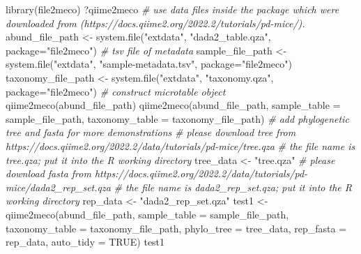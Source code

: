 \documentclass[
]{book}
\newenvironment{Shaded}{\begin{snugshade}}{\end{snugshade}}
\newcommand{\AttributeTok}[1]{\textcolor[rgb]{0.77,0.63,0.00}{#1}}
\newcommand{\CommentTok}[1]{\textcolor[rgb]{0.56,0.35,0.01}{\textit{#1}}}
\newcommand{\ConstantTok}[1]{\textcolor[rgb]{0.00,0.00,0.00}{#1}}
\newcommand{\FunctionTok}[1]{\textcolor[rgb]{0.00,0.00,0.00}{#1}}
\newcommand{\NormalTok}[1]{#1}
\newcommand{\OtherTok}[1]{\textcolor[rgb]{0.56,0.35,0.01}{#1}}
\newcommand{\StringTok}[1]{\textcolor[rgb]{0.31,0.60,0.02}{#1}}
\begin{document}
\begin{Shaded}
\begin{Highlighting}[]
\FunctionTok{library}\NormalTok{(file2meco)}
\NormalTok{?qiime2meco}
\CommentTok{\# use data files inside the package which were downloaded from (https://docs.qiime2.org/2022.2/tutorials/pd{-}mice/).}
\NormalTok{abund\_file\_path }\OtherTok{\textless{}{-}} \FunctionTok{system.file}\NormalTok{(}\StringTok{"extdata"}\NormalTok{, }\StringTok{"dada2\_table.qza"}\NormalTok{, }\AttributeTok{package=}\StringTok{"file2meco"}\NormalTok{)}
\CommentTok{\# tsv file of metadata}
\NormalTok{sample\_file\_path }\OtherTok{\textless{}{-}} \FunctionTok{system.file}\NormalTok{(}\StringTok{"extdata"}\NormalTok{, }\StringTok{"sample{-}metadata.tsv"}\NormalTok{, }\AttributeTok{package=}\StringTok{"file2meco"}\NormalTok{)}
\NormalTok{taxonomy\_file\_path }\OtherTok{\textless{}{-}} \FunctionTok{system.file}\NormalTok{(}\StringTok{"extdata"}\NormalTok{, }\StringTok{"taxonomy.qza"}\NormalTok{, }\AttributeTok{package=}\StringTok{"file2meco"}\NormalTok{)}
\CommentTok{\# construct microtable object}
\FunctionTok{qiime2meco}\NormalTok{(abund\_file\_path)}
\FunctionTok{qiime2meco}\NormalTok{(abund\_file\_path, }\AttributeTok{sample\_table =}\NormalTok{ sample\_file\_path, }\AttributeTok{taxonomy\_table =}\NormalTok{ taxonomy\_file\_path)}
\CommentTok{\# add phylogenetic tree and fasta for more demonstrations}
\CommentTok{\# please download tree from https://docs.qiime2.org/2022.2/data/tutorials/pd{-}mice/tree.qza}
\CommentTok{\# the file name is \textquotesingle{}tree.qza\textquotesingle{}; put it into the R working directory}
\NormalTok{tree\_data }\OtherTok{\textless{}{-}} \StringTok{"tree.qza"}
\CommentTok{\# please download fasta from https://docs.qiime2.org/2022.2/data/tutorials/pd{-}mice/dada2\_rep\_set.qza}
\CommentTok{\# the file name is \textquotesingle{}dada2\_rep\_set.qza\textquotesingle{}; put it into the R working directory}
\NormalTok{rep\_data }\OtherTok{\textless{}{-}} \StringTok{"dada2\_rep\_set.qza"}
\NormalTok{test1 }\OtherTok{\textless{}{-}} \FunctionTok{qiime2meco}\NormalTok{(abund\_file\_path, }\AttributeTok{sample\_table =}\NormalTok{ sample\_file\_path, }\AttributeTok{taxonomy\_table =}\NormalTok{ taxonomy\_file\_path, }\AttributeTok{phylo\_tree =}\NormalTok{ tree\_data, }\AttributeTok{rep\_fasta =}\NormalTok{ rep\_data, }\AttributeTok{auto\_tidy =} \ConstantTok{TRUE}\NormalTok{)}
\NormalTok{test1}
\end{Highlighting}
\end{Shaded}
\end{document}
